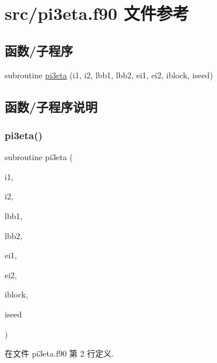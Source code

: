 \hypertarget{pi3eta_8f90}{}\section{src/pi3eta.f90 文件参考}
\label{pi3eta_8f90}
\subsection*{函数/子程序}
\begin{DoxyCompactItemize}
\item 
subroutine \mbox{\hyperlink{pi3eta_8f90_a65f01827efdafa3f970dcc4d3ea3ce9c}{pi3eta}} (i1, i2, lbb1, lbb2, ei1, ei2, iblock, iseed)
\end{DoxyCompactItemize}


\subsection{函数/子程序说明}
\mbox{\label{pi3eta_8f90_a65f01827efdafa3f970dcc4d3ea3ce9c}} 
\subsubsection{\texorpdfstring{pi3eta()}{pi3eta()}}
{\footnotesize\ttfamily subroutine pi3eta (\begin{DoxyParamCaption}\item[{}]{i1,  }\item[{}]{i2,  }\item[{}]{lbb1,  }\item[{}]{lbb2,  }\item[{}]{ei1,  }\item[{}]{ei2,  }\item[{}]{iblock,  }\item[{}]{iseed }\end{DoxyParamCaption})}



在文件 pi3eta.\+f90 第 2 行定义.

